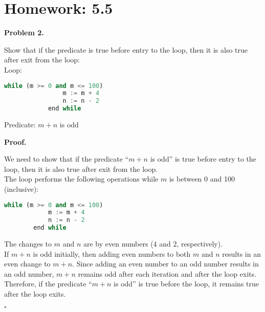 \documentclass{article}
\newenvironment{problem}[1]{
    \begin{mdframed}[backgroundcolor=gray!20, skipabove=\baselineskip, skipbelow=\baselineskip, nobreak=true, innerleftmargin=10pt, innerrightmargin=10pt, innertopmargin=10pt, innerbottommargin=10pt]
    \textbf{Problem #1.}
}{
    \end{mdframed}
}
\newenvironment{proof}{
    \begin{mdframed}[nobreak=false, innerleftmargin=10pt, innerrightmargin=10pt, innertopmargin=10pt, innerbottommargin=10pt]
    \textbf{Proof.}
}{
    \hfill $\square$
    \end{mdframed}
}
\begin{document}
\newpage \section{Homework: 5.5}
    \begin{problem}{2}
        Show that if the predicate is true before entry to the loop, then it is also true after exit from the loop: \\
        Loop:
        \begin{lstlisting}[language=Python]
            while (m >= 0 and m <= 100)
                m := m + 4
                n := n - 2
            end while
        \end{lstlisting}
        Predicate: $m+n$ is odd
    \end{problem}
    \begin{proof}
        We need to show that if the predicate ``$m + n$ is odd'' is true before entry to the loop, then it is also true after exit from the loop. \\
        The loop performs the following operations while $m$ is between 0 and 100 (inclusive):
        \begin{lstlisting}[language=Python]
        while (m >= 0 and m <= 100)
            m := m + 4
            n := n - 2
        end while
        \end{lstlisting}
        The changes to $m$ and $n$ are by even numbers (4 and 2, respectively). \\
        If $m + n$ is odd initially, then adding even numbers to both $m$ and $n$ results in an even change to $m + n$. Since adding an even number to an odd number results in an odd number, $m + n$ remains odd after each iteration and after the loop exits. \\
        Therefore, if the predicate ``$m + n$ is odd'' is true before the loop, it remains true after the loop exits.
    \end{proof}
\end{document}
